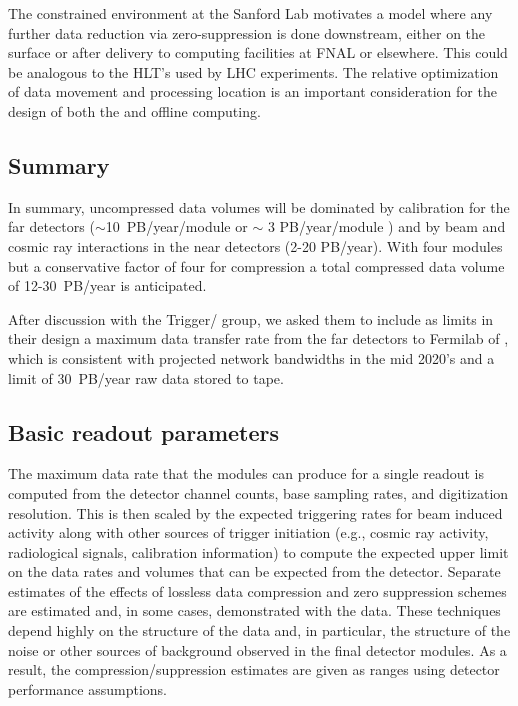 The constrained environment at the Sanford Lab motivates a model where any further data reduction via zero-suppression is done downstream, either on the surface or after delivery to computing facilities at FNAL or elsewhere. This could be analogous to the HLT's used by LHC experiments. The relative optimization of data movement and processing location is an important consideration for the design of both the  and offline computing.

\subsection{Summary}
In summary, uncompressed data volumes will be dominated by calibration for the far detectors ($\sim$10~PB/year/module  or $\sim$ 3 PB/year/module ) and by beam and cosmic ray interactions in the near detectors (2-20 PB/year).   With four  modules but a conservative factor of four for compression a total compressed data volume of 12-30~PB/year is anticipated. 

After discussion with the  Trigger/ group, we asked them to include as limits in their design a  maximum data transfer rate from the far detectors to Fermilab of \surffnalbw, which is consistent with projected network bandwidths in the mid 2020's and a limit of 30~PB/year raw data stored to tape.  




\subsection{Basic readout parameters}

The maximum data rate that the   modules can produce for a single readout is computed from the detector channel counts, base sampling rates, and digitization resolution.  This is then scaled by the expected triggering rates for beam induced activity along with other sources of trigger initiation (e.g., cosmic ray activity, radiological signals, calibration information) to compute the expected upper limit on the data rates and volumes that can be expected from the detector.  Separate estimates of the effects of lossless data compression and zero suppression schemes are estimated and, in some cases, demonstrated with the   data.  These techniques depend highly on the structure of the data and, in particular, the structure of the noise or other sources of background observed in the final  detector modules.  As a result, the compression/suppression estimates are given as ranges using detector performance assumptions.

